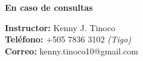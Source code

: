 \vspace*{\fill}
\begin{flushright}
    \textbf{\large En caso de consultas}

    \textbf{Instructor:} Kenny J. Tinoco \\
    \textbf{Teléfono:} +505 7836 3102 \emph{(Tigo)} \\
    \textbf{Correo:} kenny.tinoco10@gmail.com


\end{flushright}
\vspace*{0cm}